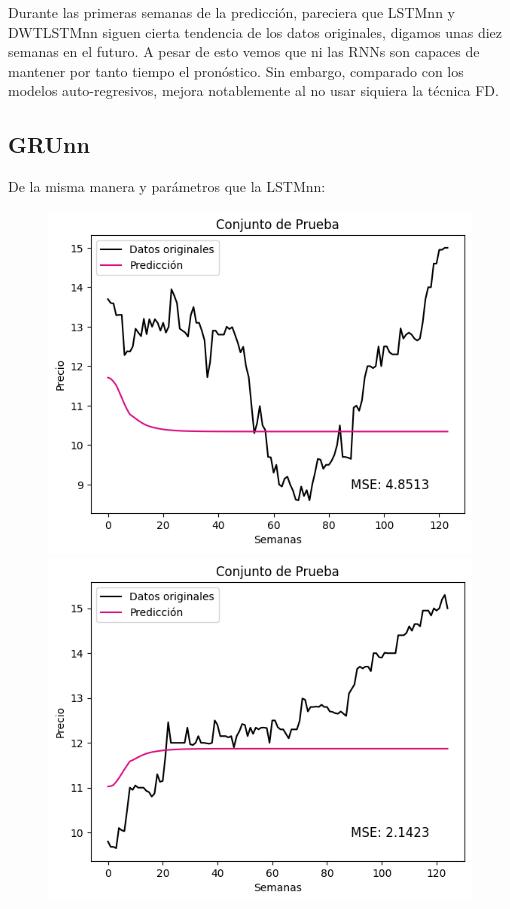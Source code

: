 Durante las primeras semanas de la predicción, pareciera que LSTMnn y DWTLSTMnn siguen cierta tendencia de los datos originales, digamos unas diez semanas en el futuro. A pesar de esto vemos que ni las RNNs son capaces de mantener por tanto tiempo el pronóstico. Sin embargo, comparado con los modelos auto-regresivos, mejora notablemente al no usar siquiera la técnica FD.

\newpage

\subsection{GRUnn}

De la misma manera y parámetros que la LSTMnn:

\begin{figure}[H]
    \begin{minipage}{0.5\textwidth}
        \centering
        \includegraphics[width=\linewidth]{Figuras/proceso_de_entrenamiento/grafs_c_prueba/muestreo_aleatorio/GRU/auto_predictiva/GRU.png}
    \end{minipage}
    \begin{minipage}{0.5\textwidth}
        \centering
        \includegraphics[width=\linewidth]{Figuras/proceso_de_entrenamiento/grafs_c_prueba/GRU/auto_predictiva/GRU.png}

\end{minipage}
\end{figure}

